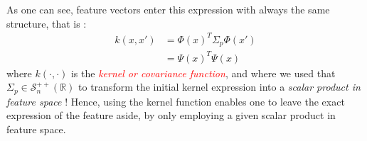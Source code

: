 \documentclass[a4paper]{article}
\begin{document}
{{			\noindent As one can see, feature vectors enter this expression with always the same structure, that is : 
			\begin{equation}
				\begin{aligned}
					k(x,x') &= \Phi(x)^T \Sigma_p \Phi(x')\\
						  &= \Psi(x)^T\Psi(x)
				\end{aligned}
			\end{equation}
			where $k(\cdot,\cdot)$ is the \emph{\textcolor{red}{kernel or covariance function}}, and where we used that $\Sigma_p\in\mathcal{S}_{n}^{++}(\mathbb{R})$ to transform the initial kernel expression into a \emph{scalar product in feature space} ! Hence, using the kernel function enables one to leave the exact expression of the feature aside, by only employing a given scalar product in feature space. 
		}
	}
	
\end{document}
